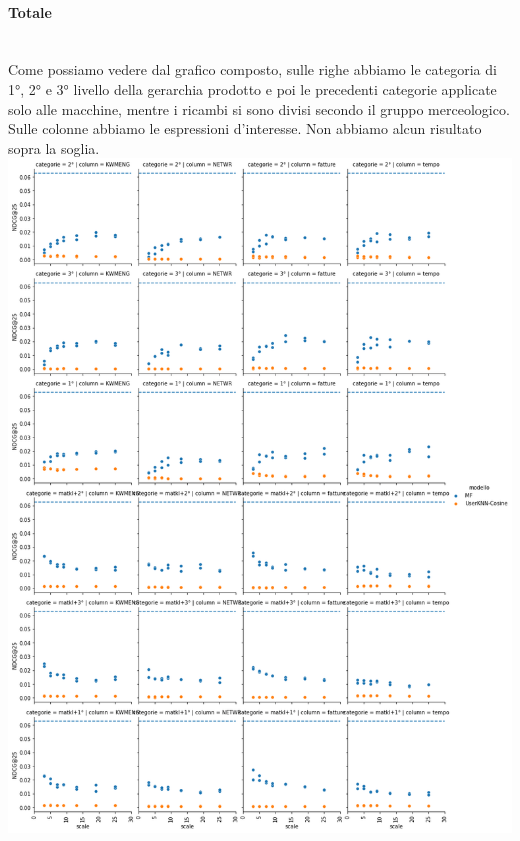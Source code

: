 \paragraph{Totale}\mbox{} \\
Come possiamo vedere dal grafico composto, sulle righe abbiamo le categoria di 1°, 2° e 3° livello della gerarchia prodotto e poi le precedenti categorie applicate solo alle macchine, mentre i ricambi si sono divisi secondo il gruppo merceologico. Sulle colonne abbiamo le espressioni d'interesse. Non abbiamo alcun risultato sopra la soglia.\\

\includegraphics[width=16cm]{figures/risultati_minmax_categoria_totale.png}


